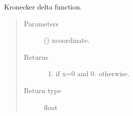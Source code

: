 \documentclass[letterpaper,10pt,english]{sphinxmanual}
\begin{document}
\begin{fulllineitems}
\label{\detokenize{modules:modules.functions.kronecker_delta}}
\pysigstartsignatures
{}
\pysigstopsignatures
\sphinxAtStartPar
Kronecker delta function.
\begin{quote}\begin{description}
\item[{Parameters}] \leavevmode
\sphinxAtStartPar
{} () \textendash{} x\sphinxhyphen{}coordinate.

\item[{Returns}] \leavevmode
\sphinxAtStartPar
\begin{enumerate}
%
\item {} 
\sphinxAtStartPar
if x=0 and 0. otherwise.

\end{enumerate}


\item[{Return type}] \leavevmode
\sphinxAtStartPar
float

\end{description}\end{quote}

\end{fulllineitems}

\end{document}
